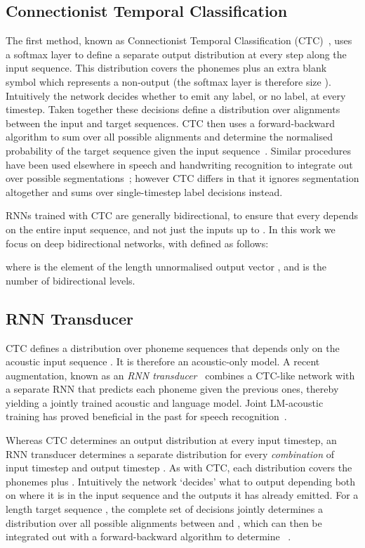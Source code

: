 \documentclass{article}
\begin{document}
\subsection{Connectionist Temporal Classification}
The first method, known as Connectionist Temporal Classification (CTC)~\cite{graves06icml,graves12supervised}, uses a softmax layer to define a separate output distribution  at every step  along the input sequence.
This distribution covers the  phonemes plus an extra blank symbol  which represents a non-output (the softmax layer is therefore size ).
Intuitively the network decides whether to emit any label, or no label, at every timestep.
Taken together these decisions define a distribution over alignments between the input and target sequences.
CTC then uses a forward-backward algorithm to sum over all possible alignments and determine the normalised probability  of the target sequence given the input sequence~\cite{graves06icml}.
Similar procedures have been used elsewhere in speech and handwriting recognition to integrate out over possible segmentations~\cite{zweig09scarf,senior95nips}; however CTC differs in that it ignores segmentation altogether and sums over single-timestep label decisions instead.

RNNs trained with CTC are generally bidirectional, to ensure that every  depends on the entire input sequence, and not just the inputs up to .
In this work we focus on deep bidirectional networks, with  defined as follows:

where  is the  element of the length  unnormalised output vector , and  is the number of bidirectional levels.


\subsection{RNN Transducer}
CTC defines a distribution over phoneme sequences that depends only on the acoustic input sequence .
It is therefore an acoustic-only model.
A recent augmentation, known as an \emph{RNN transducer}~\cite{graves12transducer} combines a CTC-like network with a separate RNN that predicts each phoneme given the previous ones, thereby yielding a jointly trained acoustic and language model.
Joint LM-acoustic training has proved beneficial in the past for speech recognition~\cite{Mohamed10investigationof,5495227}.

Whereas CTC determines an output distribution at every input timestep, an RNN transducer determines a separate distribution  for every \emph{combination} of input timestep  and output timestep .
As with CTC, each distribution covers the  phonemes plus .
Intuitively the network `decides' what to output depending both on where it is in the input sequence and the outputs it has already emitted.
For a length  target sequence , the complete set of  decisions jointly determines a distribution over all possible alignments between  and , which can then be integrated out with a forward-backward algorithm to determine ~\cite{graves12transducer}.
\end{document}
